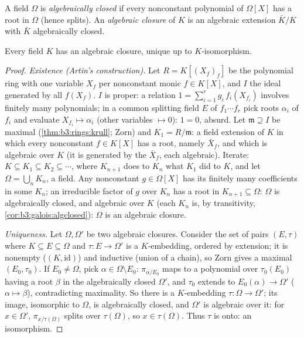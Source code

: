 \begin{definition}\label{def:b3:galois:closure}
A field $\Omega$ is \emph{algebraically closed} if every nonconstant polynomial of $\Omega[X]$ has
a root in $\Omega$ (hence splits). An \emph{algebraic
closure} of $K$ is an algebraic
extension $\bar K/K$ with $\bar K$ algebraically closed.
\end{definition}

\begin{theorem}[Steinitz]\label{thm:b3:galois:steinitz}
Every field $K$ has an algebraic closure, unique up to
$K$-isomorphism.
\end{theorem}

\begin{proof}
\emph{Existence (Artin's construction).} Let $R = K[(X_f)_f]$ be
the polynomial ring with one variable $X_f$ per nonconstant
monic $f \in K[X]$, and $I$ the ideal generated by all
$f(X_f)$. $I$ is proper: a relation $1 = \sum_{i=1}^r g_i\,
f_i(X_{f_i})$ involves finitely many polynomials; in a common
splitting field $E$ of $f_1\cdots f_r$ pick roots $\alpha_i$ of
$f_i$ and evaluate $X_{f_i} \mapsto \alpha_i$ (other variables
$\mapsto 0$): $1 = 0$, absurd. Let $\mathfrak m \supseteq I$ be
maximal (\cref{thm:b3:rings:krull}; Zorn) and $K_1 = R/\mathfrak
m$: a field extension of $K$ in which every nonconstant $f \in
K[X]$ has a root, namely $\bar X_f$, and which is algebraic over
$K$ (it is generated by the $\bar X_f$, each algebraic).
Iterate: $K \subseteq K_1 \subseteq K_2 \subseteq \cdots$, where
$K_{n+1}$ does to $K_n$ what $K_1$ did to $K$, and let $\Omega =
\bigcup_n K_n$, a field. Any nonconstant $g \in \Omega[X]$ has
its finitely many coefficients in some $K_n$; an irreducible
factor of $g$ over $K_n$ has a root in $K_{n+1} \subseteq
\Omega$: $\Omega$ is algebraically closed, and algebraic over
$K$ (each $K_n$ is, by transitivity,
\cref{cor:b3:galois:algclosed}): $\Omega$ is an algebraic
closure.

\emph{Uniqueness.} Let $\Omega, \Omega'$ be two algebraic
closures. Consider the set of pairs $(E, \tau)$ where $K
\subseteq E \subseteq \Omega$ and $\tau\colon E \to \Omega'$ is a
$K$-embedding, ordered by extension; it is nonempty ($(K,
\mathrm{id})$) and inductive (union of a chain), so Zorn gives a
maximal $(E_0, \tau_0)$. If $E_0 \neq \Omega$, pick $\alpha \in
\Omega\setminus E_0$: $\pi_{\alpha/E_0}$ maps to a polynomial
over $\tau_0(E_0)$ having a root $\beta$ in the algebraically
closed $\Omega'$, and $\tau_0$ extends to $E_0(\alpha) \to
\Omega'$ ($\alpha \mapsto \beta$), contradicting maximality. So
there is a $K$-embedding $\tau \colon \Omega \to \Omega'$; its
image, isomorphic to $\Omega$, is algebraically closed, and
$\Omega'$ is algebraic over it: for $x \in \Omega'$,
$\pi_{x/\tau(\Omega)}$ splits over $\tau(\Omega)$, so $x \in
\tau(\Omega)$. Thus $\tau$ is onto: an isomorphism.
\end{proof}

